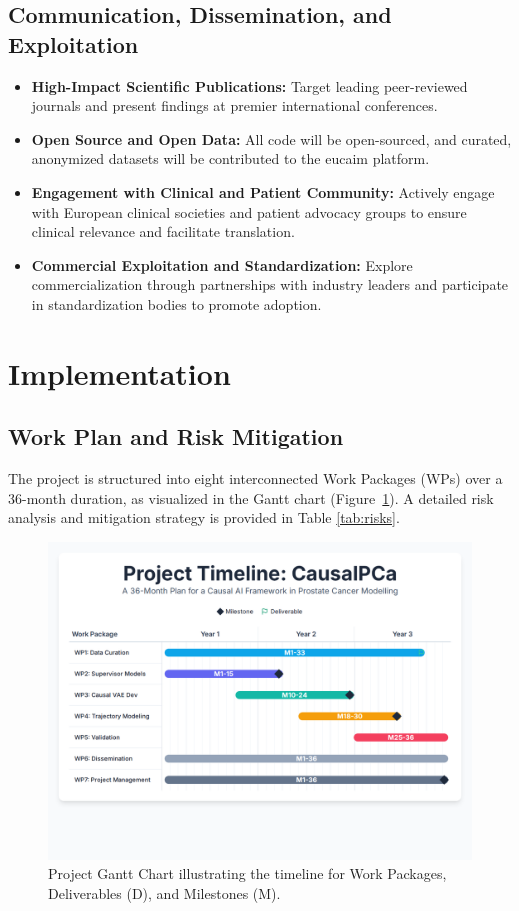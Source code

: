 \documentclass[11pt, a4paper]{article}
\begin{document}
\subsection{Communication, Dissemination, and Exploitation}
\begin{itemize}
    \item \textbf{High-Impact Scientific Publications:} Target leading peer-reviewed journals and present findings at premier international conferences.
    \item \textbf{Open Source and Open Data:} All code will be open-sourced, and curated, anonymized datasets will be contributed to the \gls{eucaim} platform.
    \item \textbf{Engagement with Clinical and Patient Community:} Actively engage with European clinical societies and patient advocacy groups to ensure clinical relevance and facilitate translation.
    \item \textbf{Commercial Exploitation and Standardization:} Explore commercialization through partnerships with industry leaders and participate in standardization bodies to promote adoption.
\end{itemize}

\section{Implementation}

\subsection{Work Plan and Risk Mitigation}
The project is structured into eight interconnected Work Packages (WPs) over a 36-month duration, as visualized in the Gantt chart (Figure~\ref{fig:gantt}). A detailed risk analysis and mitigation strategy is provided in Table \ref{tab:risks}.

\begin{figure}[H]
    \centering
    \includegraphics[width=\textwidth]{gantt.png}
    \caption{Project Gantt Chart illustrating the timeline for Work Packages, Deliverables (D), and Milestones (M).}
    \label{fig:gantt}
\end{figure}
\end{document}
